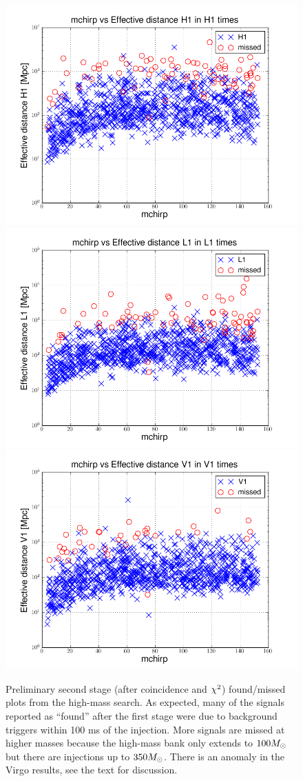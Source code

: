 \begin{figure}
  \includegraphics[width=0.5\linewidth]{figures/ninja2_results/H1-plotinspmissed_HIGH_FULL_DATA_mchirp-eff_dist-log-H1-871147552-5209912_first} 
  \includegraphics[width=0.5\linewidth]{figures/ninja2_results/L1-plotinspmissed_HIGH_FULL_DATA_mchirp-eff_dist-log-L1-871147552-5209912_first} \\
  \includegraphics[width=0.5\linewidth]{figures/ninja2_results/V1-plotinspmissed_HIGH_FULL_DATA_mchirp-eff_dist-log-V1-871147552-5209912_first} \\
  \caption[Second stage found/missed plots from the high-mass search]{
  \label{f:ninja2_cbc_results_high_second}
Preliminary second stage (after coincidence and $\chi^2$) found/missed plots from
the high-mass search.  As expected, many of the signals reported as
``found'' after the first stage were due to background triggers within
100 ms of the injection.  More signals are missed at higher masses
because the high-mass bank only extends to $100 M_\odot$ but there are
injections up to $350 M_\odot$.  There is an anomaly in the Virgo
results, see the text for discussion.
}
\end{figure}%

